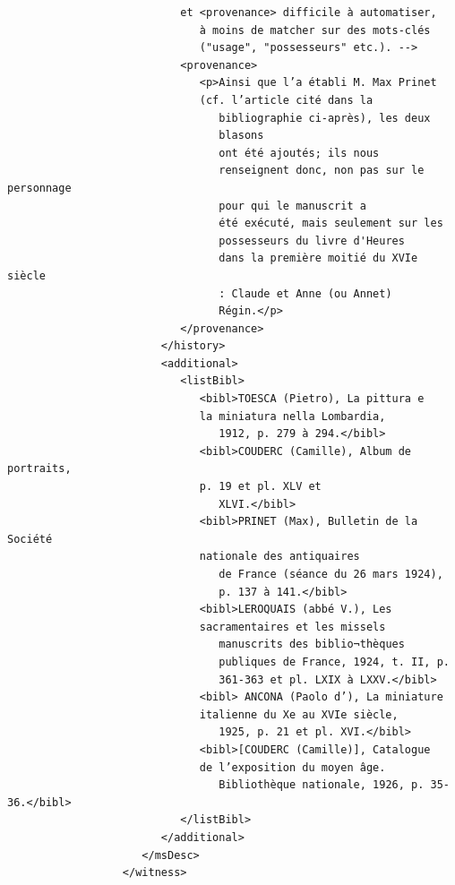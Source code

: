 \documentclass[a4paper,12pt,twoside]{book}
\begin{document}
\begin{verbatim}
                           et <provenance> difficile à automatiser, 
                              à moins de matcher sur des mots-clés 
                              ("usage", "possesseurs" etc.). -->
                           <provenance>
                              <p>Ainsi que l’a établi M. Max Prinet 
                              (cf. l’article cité dans la
                                 bibliographie ci-après), les deux 
                                 blasons
                                 ont été ajoutés; ils nous
                                 renseignent donc, non pas sur le personnage
                                 pour qui le manuscrit a
                                 été exécuté, mais seulement sur les 
                                 possesseurs du livre d'Heures
                                 dans la première moitié du XVIe siècle
                                 : Claude et Anne (ou Annet)
                                 Régin.</p>
                           </provenance>
                        </history>
                        <additional>
                           <listBibl>
                              <bibl>TOESCA (Pietro), La pittura e 
                              la miniatura nella Lombardia,
                                 1912, p. 279 à 294.</bibl>
                              <bibl>COUDERC (Camille), Album de portraits,
                              p. 19 et pl. XLV et
                                 XLVI.</bibl>
                              <bibl>PRINET (Max), Bulletin de la Société
                              nationale des antiquaires
                                 de France (séance du 26 mars 1924), 
                                 p. 137 à 141.</bibl>
                              <bibl>LEROQUAIS (abbé V.), Les 
                              sacramentaires et les missels
                                 manuscrits des biblio¬thèques 
                                 publiques de France, 1924, t. II, p. 
                                 361-363 et pl. LXIX à LXXV.</bibl>
                              <bibl> ANCONA (Paolo d’), La miniature
                              italienne du Xe au XVIe siècle,
                                 1925, p. 21 et pl. XVI.</bibl>
                              <bibl>[COUDERC (Camille)], Catalogue 
                              de l’exposition du moyen âge.
                                 Bibliothèque nationale, 1926, p. 35-36.</bibl>
                           </listBibl>
                        </additional>
                     </msDesc>
                  </witness>

\end{verbatim}
\end{document}
